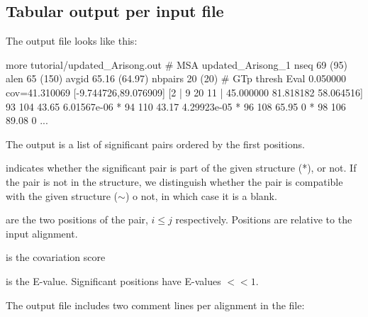 
\subsection{Tabular output per input file}

The output file  looks like this:

\begin{sreoutput}
more tutorial/updated_Arisong.out 
# MSA updated_Arisong_1 nseq 69 (95) alen 65 (150) avgid 65.16 (64.97) nbpairs 20 (20)
# GTp thresh Eval 0.050000 cov=41.310069 [-9.744726,89.076909] [2 | 9 20 11 | 45.000000 81.818182 58.064516] 
                93             104      43.65   6.01567e-06
*               94             110      43.17   4.29923e-05
*               96             108      65.95   0
*               98             106      89.08   0
...
\end{sreoutput}
The output is a list of significant pairs ordered by the first positions. \\

\begin{sreitems}{}
\item[\emprog{First column}] indicates whether the significant pair is
  part of the given structure (*), or not.  If the pair is not in the
  structure, we distinguish whether the pair is compatible with the
  given structure ($\sim$) o not, in which case it is a blank.

\item[\emprog{Second and third columns}] are the two positions of the
  pair, $i\leq j$ respectively. Positions are relative to the input
  alignment.

\item[\emprog{Forth column}] is the covariation score

\item[\emprog{Fifth column}] is the E-value. Significant positions
  have E-values $<< 1$.
\end{sreitems}

The output file  includes two
comment lines per alignment in the file:

